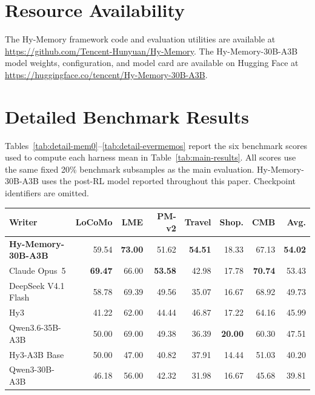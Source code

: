 \documentclass{article}
\newcommand{\hymemorycodeurl}{https://github.com/Tencent-Hunyuan/Hy-Memory}
\newcommand{\hymemorymodelurl}{https://huggingface.co/tencent/Hy-Memory-30B-A3B}
\renewcommand{\arraystretch}{1.08}
\begin{document}
\section*{Resource Availability}

The Hy-Memory framework code and evaluation utilities are available at
\url{\hymemorycodeurl}. The Hy-Memory-30B-A3B model weights, configuration, and model card are
available on Hugging Face at \url{\hymemorymodelurl}.




\appendix

\section{Detailed Benchmark Results}
\label{sec:detailed-results}

Tables~\ref{tab:detail-mem0}--\ref{tab:detail-evermemos} report the six benchmark scores used to compute each harness mean in Table~\ref{tab:main-results}. All scores use the same fixed 20\% benchmark subsamples as the main evaluation. Hy-Memory-30B-A3B uses the post-RL model reported throughout this paper. Checkpoint identifiers are omitted.

\newpage
\begingroup
\setlength{\abovecaptionskip}{2pt}
\setlength{\belowcaptionskip}{2pt}
\renewcommand{\arraystretch}{1.04}
\begin{minipage}{\linewidth}
\centering
\scriptsize
\setlength{\tabcolsep}{2.4pt}
\begin{tabular}{@{}lrrrrrrr@{}}
\toprule
Writer & LoCoMo & LME & PM-v2 & Travel & Shop. & CMB & Avg. \\
\midrule
\textbf{Hy-Memory-30B-A3B} & 59.54 & \textbf{73.00} & 51.62 & \textbf{54.51} & 18.33 & 67.13 & \textbf{54.02} \\
Claude Opus~5 & \textbf{69.47} & 66.00 & \textbf{53.58} & 42.98 & 17.78 & \textbf{70.74} & 53.43 \\
DeepSeek V4.1 Flash & 58.78 & 69.39 & 49.56 & 35.07 & 16.67 & 68.92 & 49.73 \\
Hy3 & 41.22 & 62.00 & 44.44 & 46.87 & 17.22 & 64.16 & 45.99 \\
Qwen3.6-35B-A3B & 50.00 & 69.00 & 49.38 & 36.39 & \textbf{20.00} & 60.30 & 47.51 \\
Hy3-A3B Base & 50.00 & 47.00 & 40.82 & 37.91 & 14.44 & 51.03 & 40.20 \\
Qwen3-30B-A3B & 46.18 & 56.00 & 42.32 & 31.98 & 16.67 & 45.68 & 39.81 \\
\bottomrule
\end{tabular}
\label{tab:detail-mem0}
\end{minipage}
\vspace{0pt}
\end{document}
